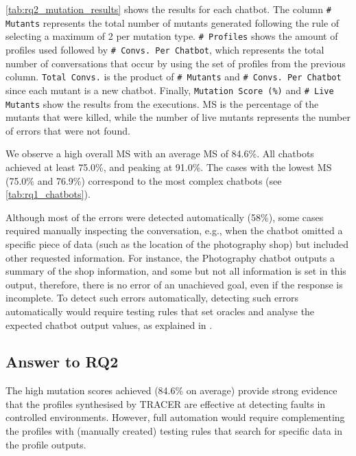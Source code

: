 \autoref{tab:rq2_mutation_results}
shows the results for each chatbot.
The column \texttt{\# Mutants} represents
the total number of mutants generated
following the rule of selecting a maximum of 2 per mutation type.
\texttt{\# Profiles} shows the amount of profiles used
followed by \texttt{\# Convs. Per Chatbot},
which represents the total number of conversations
that occur by using the set of profiles from the previous column.
\texttt{Total Convs.} is the product of
\texttt{\# Mutants} and \texttt{\# Convs. Per Chatbot}
since each mutant is a new chatbot.
Finally, \texttt{Mutation Score (\%)} and \texttt{\# Live Mutants}
show the results from the executions.
\ac{MS} is the percentage of the mutants that were killed,
while the number of live mutants
represents the number of errors that were not found.

We observe a high overall \acl{MS}
with an average \ac{MS} of 84.6\%.
All chatbots achieved at least 75.0\%,
and peaking at 91.0\%.
The cases with the lowest \ac{MS}
(75.0\% and 76.9\%)
correspond to the most complex chatbots
(see \autoref{tab:rq1_chatbots}).

Although most of the errors were detected automatically (58\%),
some cases required manually inspecting the conversation,
e.g., when the chatbot omitted a specific piece of data
(such as the location of the photography shop)
but included other requested information.
For instance, the Photography chatbot outputs a summary of the shop information,
and some but not all information is set in this output,
therefore, there is no error of an unachieved goal,
even if the response is incomplete.
To detect such errors automatically,
detecting such errors automatically
would require testing rules that set oracles
and analyse the expected chatbot output values,
as explained in \autocite{delaraSensei}.

\subsection{Answer to RQ2}

The high mutation scores achieved (84.6\% on average)
provide strong evidence
that the profiles synthesised by TRACER are effective
at detecting faults in controlled environments.
However, full automation would require
complementing the profiles with (manually created) testing rules
that search for specific data in the profile outputs.

